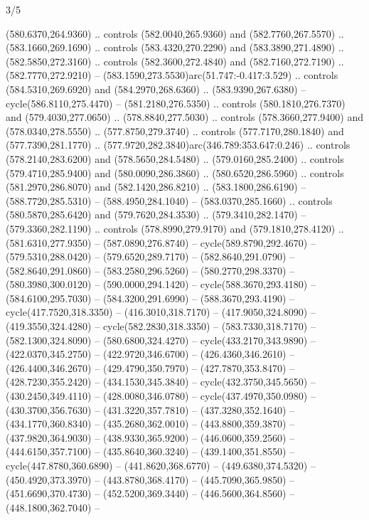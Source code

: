 \begin{flagdescription}{3/5}
\begin{scope}[xshift=0.5\flaglength,yshift=0.5\flagwidth,scale=\flagwidth/768]
\begin{scope}[y=0.80pt, x=0.80pt, yscale=-1.75, xscale=1.75,xshift=-74mm,yshift=-108mm]
\begin{scope}[shift={(-236.93803,83.83961)},fill=cc8a400]
  (580.6370,264.9360) .. controls (582.0040,265.9360) and (582.7760,267.5570) ..
  (583.1660,269.1690) .. controls (583.4320,270.2290) and (583.3890,271.4890) ..
  (582.5850,272.3160) .. controls (582.3600,272.4840) and (582.7160,272.7190) ..
  (582.7770,272.9210) -- (583.1590,273.5530)arc(51.747:-0.417:3.529) .. controls
  (584.5310,269.6920) and (584.2970,268.6360) .. (583.9390,267.6380) --
  cycle(586.8110,275.4470) -- (581.2180,276.5350) .. controls
  (580.1810,276.7370) and (579.4030,277.0650) .. (578.8840,277.5030) .. controls
  (578.3660,277.9400) and (578.0340,278.5550) .. (577.8750,279.3740) .. controls
  (577.7170,280.1840) and (577.7390,281.1770) ..
  (577.9720,282.3840)arc(346.789:353.647:0.246) .. controls (578.2140,283.6200)
  and (578.5650,284.5480) .. (579.0160,285.2400) .. controls (579.4710,285.9400)
  and (580.0090,286.3860) .. (580.6520,286.5960) .. controls (581.2970,286.8070)
  and (582.1420,286.8210) .. (583.1800,286.6190) -- (588.7720,285.5310) --
  (588.4950,284.1040) -- (583.0370,285.1660) .. controls (580.5870,285.6420) and
  (579.7620,284.3530) .. (579.3410,282.1470) -- (579.3360,282.1190) .. controls
  (578.8990,279.9170) and (579.1810,278.4120) .. (581.6310,277.9350) --
  (587.0890,276.8740) -- cycle(589.8790,292.4670) -- (579.5310,288.0420) --
  (579.6520,289.7170) -- (582.8640,291.0790) -- (582.8640,291.0860) --
  (583.2580,296.5260) -- (580.2770,298.3370) -- (580.3980,300.0120) --
  (590.0000,294.1420) -- cycle(588.3670,293.4180) -- (584.6100,295.7030) --
  (584.3200,291.6990) -- (588.3670,293.4190) -- cycle(417.7520,318.3350) --
  (416.3010,318.7170) -- (417.9050,324.8090) -- (419.3550,324.4280) --
  cycle(582.2830,318.3350) -- (583.7330,318.7170) -- (582.1300,324.8090) --
  (580.6800,324.4270) -- cycle(433.2170,343.9890) -- (422.0370,345.2750) --
  (422.9720,346.6700) -- (426.4360,346.2610) -- (426.4400,346.2670) --
  (429.4790,350.7970) -- (427.7870,353.8470) -- (428.7230,355.2420) --
  (434.1530,345.3840) -- cycle(432.3750,345.5650) -- (430.2450,349.4110) --
  (428.0080,346.0780) -- cycle(437.4970,350.0980) -- (430.3700,356.7630) --
  (431.3220,357.7810) -- (437.3280,352.1640) -- (434.1770,360.8340) --
  (435.2680,362.0010) -- (443.8800,359.3870) -- (437.9820,364.9030) --
  (438.9330,365.9200) -- (446.0600,359.2560) -- (444.6150,357.7100) --
  (435.8640,360.3240) -- (439.1400,351.8550) -- cycle(447.8780,360.6890) --
  (441.8620,368.6770) -- (449.6380,374.5320) -- (450.4920,373.3970) --
  (443.8780,368.4170) -- (445.7090,365.9850) -- (451.6690,370.4730) --
  (452.5200,369.3440) -- (446.5600,364.8560) -- (448.1800,362.7040) --

\end{scope}
\end{scope}
\end{scope}
\end{flagdescription}
